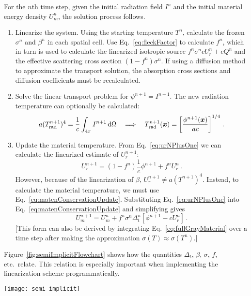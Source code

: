 For the $n$th time step, given the initial radiation field $I^{n}$ and the
initial material energy density $U_m^n$, the solution process follows.
\prelistpar
\begin{enumerate}
  \item Linearize the system. Using the starting temperature $T^n$, calculate
    the frozen $\sigma^n$ and $\beta^n$ in each spatial cell. Use
    Eq.~\eqref{eq:fleckFactor} to calculate $f^n$, which in turn is used to
    calculate the linearized isotropic source $f^n \sigma^n c U_r^n + c Q^n$
    and the effective scattering cross section $\left(1 - f^n\right) \sigma^n$.
    If using a diffusion method to approximate the transport solution, the
    absorption cross sections and diffusion coefficients must be recalculated.
  \item Solve the linear transport problem for $\psi^{n+1}=I^{n+1}$. The new
    radiation
    temperature can optionally be calculated:
    \begin{equation*}
      a (T_\text{rad}^{n+1})^4 = \frac{1}{c} \int_{4\pi} I^{n+1}
      \mathop{}\!\mathrm{d} \Omega
      \quad \Longrightarrow \quad
      T_\text{rad}^{n+1}(\bm{x}) = \left[ \frac{\phi^{n+1}(\bm{x})}{ac} \right]^{1/4}\,.
    \end{equation*}
  \item Update the material temperature. From Eq.~\eqref{eq:urNPlusOne}
    we can calculate the linearized estimate of $U_r^{n+1}$:
    \begin{equation*}
      U_r^{n+1} = \left(1 - f^n\right) \frac1c \phi^{n+1}  + f^n U_r^n\,.
    \end{equation*}
    However, because of the linearization of $\beta$, $U_r^{n+1} \ne a
    (T^{n+1})^4$. Instead, to calculate the material temperature, we must use
    Eq.~\eqref{eq:matenConservationUpdate}. Substituting
    Eq.~\eqref{eq:urNPlusOne} into Eq.~\eqref{eq:matenConservationUpdate}
    and simplifying gives
    \begin{equation}\label{eq:matenConservationUpdate2}
      U_m^{n+1} =  U_m^n + f^n \sigma^n \Delta_t^n \left[ \phi^{n+1} - c U_r^n \right] \,.
    \end{equation}
    [This form can also be derived by integrating
    Eq.~\eqref{eq:fullGrayMaterial} over a time step after making the
    approximation $\sigma(T) \approx \sigma(T^n)$.]
\end{enumerate}

Figure~\ref{fig:semiImplicitFlowchart} shows how the quantities $\Delta_t$,
$\beta$, $\sigma$, $f$, etc.~relate. This relation is especially important when
implementing the linearization scheme programmatically. 
\begin{sidewaysfigure}[hp]
  \centering
  \texttt{[image: semi-implicit]}
  \caption{Dependency graph of quantities in the semi-implicit discretization.}
  \label{fig:semiImplicitFlowchart}
\end{sidewaysfigure}

